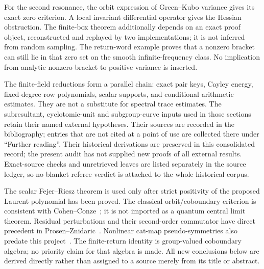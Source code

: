 For the second resonance, the orbit expression of Green--Kubo variance gives
its exact zero criterion. A local invariant differential operator gives the
Hessian obstruction. The finite-box theorem additionally depends on an exact
proof object, reconstructed and replayed by two implementations; it is not
inferred from random sampling. The return-word example proves that a nonzero
bracket can still lie in that zero set on the smooth infinite-frequency class.
No implication from analytic nonzero bracket to positive variance is inserted.

The finite-field reductions form a parallel chain: exact pair keys, Cayley
energy, fixed-degree row polynomials, scalar supports, and conditional
arithmetic estimates. They are not a substitute for spectral trace estimates.
The subresultant, cyclotomic-unit and subgroup-curve inputs used in those
sections retain their named external hypotheses. Their sources are recorded
in the bibliography; entries that are not cited at a point of use are
collected there under ``Further reading''. Their historical derivations
are preserved in this consolidated record; the present audit has not supplied
new proofs of all external results. Exact-source checks and unretrieved leaves
are listed separately in the source ledger, so no blanket referee verdict is
attached to the whole historical corpus.

The scalar Fejer--Riesz theorem is used only after strict positivity of the
proposed Laurent polynomial has been proved. The classical orbit/coboundary
criterion is consistent with Cohen--Conze~\cite{CohenConze}; it is not
imported as a quantum central limit theorem. Residual perturbations and their
second-order commutator have direct precedent in Prosen--Znidaric~\cite{PZ2005}.
Nonlinear cat-map pseudo-symmetries also predate this project~\cite{KM2000}.
The finite-return identity is group-valued coboundary algebra; no priority
claim for that algebra is made. All new conclusions below are derived directly
rather than assigned to a source merely from its title or abstract.

